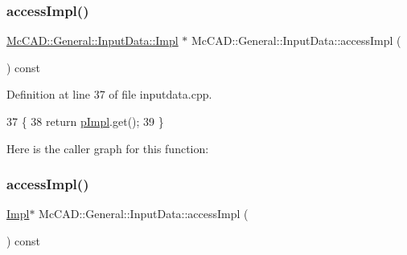 \subsubsection{\texorpdfstring{access\+Impl()}{accessImpl()}\hspace{0.1cm}{\footnotesize\ttfamily [1/2]}}
{\footnotesize\ttfamily \hyperlink{classMcCAD_1_1General_1_1InputData_1_1Impl}{Mc\+C\+A\+D\+::\+General\+::\+Input\+Data\+::\+Impl} $\ast$ Mc\+C\+A\+D\+::\+General\+::\+Input\+Data\+::access\+Impl (\begin{DoxyParamCaption}{ }\end{DoxyParamCaption}) const}



Definition at line 37 of file inputdata.\+cpp.


\begin{DoxyCode}
37                                        \{
38     \textcolor{keywordflow}{return} \hyperlink{classMcCAD_1_1General_1_1InputData_a6a636f3d471d293dcb12c59d29af50c9}{pImpl}.get();
39 \}
\end{DoxyCode}
Here is the caller graph for this function\+:
\mbox{\label{classMcCAD_1_1General_1_1InputData_aeb2134f5c5d789ce81f1975a93c0e642}} 
\subsubsection{\texorpdfstring{access\+Impl()}{accessImpl()}\hspace{0.1cm}{\footnotesize\ttfamily [2/2]}}
{\footnotesize\ttfamily \hyperlink{classMcCAD_1_1General_1_1InputData_1_1Impl}{Impl}$\ast$ Mc\+C\+A\+D\+::\+General\+::\+Input\+Data\+::access\+Impl (\begin{DoxyParamCaption}{ }\end{DoxyParamCaption}) const}

\mbox{\label{classMcCAD_1_1General_1_1InputData_a19ffac929c6410bb768cc4a7630183b0}} 
